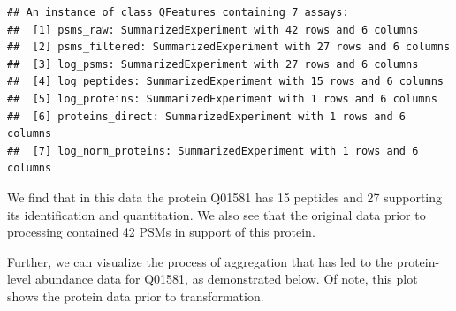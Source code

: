 \documentclass[9pt,a4paper,]{extarticle}
\begin{document}
\begin{verbatim}
## An instance of class QFeatures containing 7 assays:
##  [1] psms_raw: SummarizedExperiment with 42 rows and 6 columns 
##  [2] psms_filtered: SummarizedExperiment with 27 rows and 6 columns 
##  [3] log_psms: SummarizedExperiment with 27 rows and 6 columns 
##  [4] log_peptides: SummarizedExperiment with 15 rows and 6 columns 
##  [5] log_proteins: SummarizedExperiment with 1 rows and 6 columns 
##  [6] proteins_direct: SummarizedExperiment with 1 rows and 6 columns 
##  [7] log_norm_proteins: SummarizedExperiment with 1 rows and 6 columns
\end{verbatim}

We find that in this data the protein Q01581 has 15
peptides and 27 supporting its identification
and quantitation. We also see that the original data prior to processing contained
42 PSMs in support of this protein.

Further, we can visualize the process of aggregation that has led to the protein-
level abundance data for Q01581, as demonstrated below. Of note, this plot shows
the protein data prior to transformation.
\end{document}
